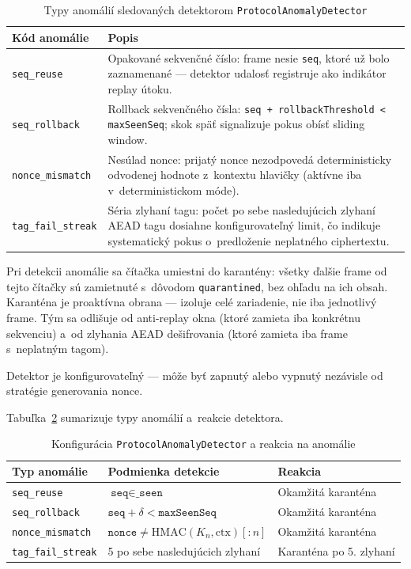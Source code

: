 \begin{table}[H]
\renewcommand{\arraystretch}{1.2}
\centering
\caption{Typy anomálií sledovaných detektorom \texttt{ProtocolAnomalyDetector}}
\label{tab:anomaly-types}
\begin{tabular}{p{3.2cm} p{10.3cm}}
\toprule
\textbf{Kód anomálie} & \textbf{Popis} \\
\midrule
\texttt{seq\_reuse} & Opakované sekvenčné číslo: frame nesie \texttt{seq}, ktoré už bolo zaznamenané --- detektor udalosť registruje ako indikátor replay útoku. \\
\texttt{seq\_rollback} & Rollback sekvenčného čísla: \texttt{seq + rollbackThreshold < maxSeenSeq}; skok späť signalizuje pokus obísť sliding window. \\
\texttt{nonce\_mismatch} & Nesúlad nonce: prijatý nonce nezodpovedá deterministicky odvodenej hodnote z~kontextu hlavičky (aktívne iba v~deterministickom móde). \\
\texttt{tag\_fail\_streak} & Séria zlyhaní tagu: počet po sebe nasledujúcich zlyhaní AEAD tagu dosiahne konfigurovateľný limit, čo indikuje systematický pokus o~predloženie neplatného ciphertextu. \\
\bottomrule
\end{tabular}
\end{table}

Pri detekcii anomálie sa čítačka umiestni do karantény: všetky ďalšie frame od tejto čítačky sú zamietnuté s~dôvodom \texttt{quarantined}, bez ohľadu na ich obsah. Karanténa je proaktívna obrana --- izoluje celé zariadenie, nie iba jednotlivý frame. Tým sa odlišuje od anti-replay okna (ktoré zamieta iba konkrétnu sekvenciu) a~od zlyhania AEAD dešifrovania (ktoré zamieta iba frame s~neplatným tagom).

Detektor je konfigurovateľný --- môže byť zapnutý alebo vypnutý nezávisle od stratégie generovania nonce.

Tabuľka~\ref{tab:anomaly-config} sumarizuje typy anomálií a~reakcie detektora.

\begin{table}[H]
\renewcommand{\arraystretch}{1.3}
\centering
\caption{Konfigurácia \texttt{ProtocolAnomalyDetector} a reakcia na anomálie}
\label{tab:anomaly-config}
\begin{tabular}{l l l}
\toprule
\textbf{Typ anomálie} & \textbf{Podmienka detekcie} & \textbf{Reakcia} \\
\midrule
\texttt{seq\_reuse} & $\texttt{seq} \in \texttt{\_seen}$ & Okamžitá karanténa \\
\texttt{seq\_rollback} & $\texttt{seq} + \delta < \texttt{maxSeenSeq}$ & Okamžitá karanténa \\
\texttt{nonce\_mismatch} & $\texttt{nonce} \neq \text{HMAC}(K_n, \text{ctx})[:n]$ & Okamžitá karanténa \\
\texttt{tag\_fail\_streak} & 5 po sebe nasledujúcich zlyhaní & Karanténa po 5. zlyhaní \\
\bottomrule
\end{tabular}
\end{table}



